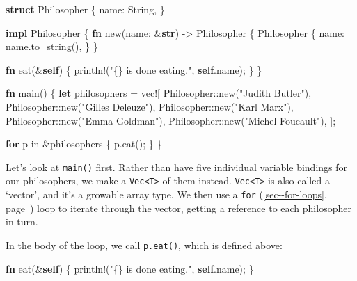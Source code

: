 \documentclass[a4paper,]{book}
\renewcommand*{\hyperref}[2][\ar]{%
  \def\ar{#2}%
  #2 (\autoref{#1}, page~\pageref{#1})}
\newenvironment{Shaded}{\begin{snugshade}}{\end{snugshade}}
\newcommand{\KeywordTok}[1]{\textcolor[rgb]{0.13,0.29,0.53}{\textbf{{#1}}}}
\newcommand{\StringTok}[1]{\textcolor[rgb]{0.31,0.60,0.02}{{#1}}}
\newcommand{\OtherTok}[1]{\textcolor[rgb]{0.56,0.35,0.01}{{#1}}}
\newcommand{\NormalTok}[1]{{#1}}
\begin{document}
\begin{Shaded}
\begin{Highlighting}[]
\KeywordTok{struct} \NormalTok{Philosopher \{}
    \NormalTok{name: String,}
\NormalTok{\}   }

\KeywordTok{impl} \NormalTok{Philosopher \{ }
    \KeywordTok{fn} \NormalTok{new(name: &}\KeywordTok{str}\NormalTok{) -> Philosopher \{}
        \NormalTok{Philosopher \{}
            \NormalTok{name: name.to_string(),}
        \NormalTok{\}}
    \NormalTok{\}}
    
    \KeywordTok{fn} \NormalTok{eat(&}\KeywordTok{self}\NormalTok{) \{}
        \OtherTok{println!}\NormalTok{(}\StringTok{"\{\} is done eating."}\NormalTok{, }\KeywordTok{self}\NormalTok{.name);}
    \NormalTok{\}}
\NormalTok{\}}

\KeywordTok{fn} \NormalTok{main() \{}
    \KeywordTok{let} \NormalTok{philosophers = }\OtherTok{vec!}\NormalTok{[}
        \NormalTok{Philosopher::new(}\StringTok{"Judith Butler"}\NormalTok{),}
        \NormalTok{Philosopher::new(}\StringTok{"Gilles Deleuze"}\NormalTok{),}
        \NormalTok{Philosopher::new(}\StringTok{"Karl Marx"}\NormalTok{),}
        \NormalTok{Philosopher::new(}\StringTok{"Emma Goldman"}\NormalTok{),}
        \NormalTok{Philosopher::new(}\StringTok{"Michel Foucault"}\NormalTok{),}
    \NormalTok{];}

    \KeywordTok{for} \NormalTok{p in &philosophers \{}
        \NormalTok{p.eat();}
    \NormalTok{\}}
\NormalTok{\}}
\end{Highlighting}
\end{Shaded}

Let's look at \texttt{main()} first. Rather than have five individual
variable bindings for our philosophers, we make a
\texttt{Vec\textless{}T\textgreater{}} of them instead.
\texttt{Vec\textless{}T\textgreater{}} is also called a `vector', and
it's a growable array type. We then use a
\hyperref[sec--for-loops]{\texttt{for}} loop to iterate through the
vector, getting a reference to each philosopher in turn.

In the body of the loop, we call \texttt{p.eat()}, which is defined
above:

\begin{Shaded}
\begin{Highlighting}[]
\KeywordTok{fn} \NormalTok{eat(&}\KeywordTok{self}\NormalTok{) \{}
    \OtherTok{println!}\NormalTok{(}\StringTok{"\{\} is done eating."}\NormalTok{, }\KeywordTok{self}\NormalTok{.name);}
\NormalTok{\}}
\end{Highlighting}
\end{Shaded}
\end{document}
